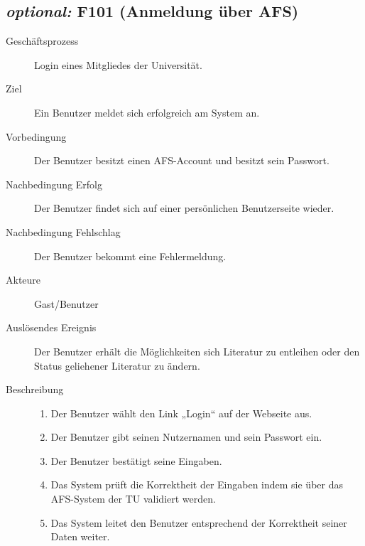 \subsection{\emph{optional:} F101 (Anmeldung über AFS)}
\begin{description}
  \item[Geschäftsprozess]Login eines Mitgliedes der Universität.
  \item[Ziel]Ein Benutzer meldet sich erfolgreich am System an.
  \item[Vorbedingung]Der Benutzer besitzt einen AFS-Account und besitzt sein Passwort.
  \item[Nachbedingung Erfolg]Der Benutzer findet sich auf einer persönlichen Benutzerseite wieder.
  \item[Nachbedingung Fehlschlag]Der Benutzer bekommt eine Fehlermeldung.
  \item[Akteure]Gast/Benutzer
  \item[Auslösendes Ereignis]Der Benutzer erhält die Möglichkeiten sich Literatur zu entleihen oder den Status geliehener Literatur zu ändern.
  \item[Beschreibung]
    \begin{enumerate}
      \item Der Benutzer wählt den Link „Login“ auf der Webseite aus.
      \item Der Benutzer gibt seinen Nutzernamen und sein Passwort ein.
      \item Der Benutzer bestätigt seine Eingaben.
      \item Das System prüft die Korrektheit der Eingaben indem sie über das AFS-System der TU validiert werden.
      \item Das System leitet den Benutzer entsprechend der Korrektheit seiner Daten weiter.
    \end{enumerate}
\end{description}

